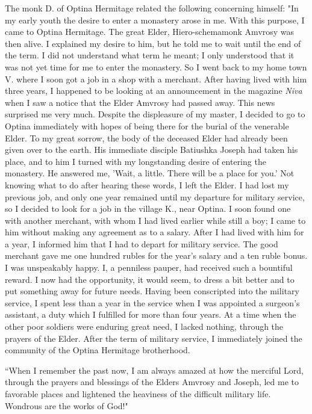 The monk D. of Optina Hermitage related the following concerning himself: "In my early youth the desire to enter a monastery arose in me. With this purpose, I came to Optina Hermitage. The great Elder, Hiero-schemamonk Amvrosy was then alive. I explained my desire to him, but he told me to wait until the end of the term. I did not understand what term he meant; I only understood that it was not yet time for me to enter the monastery. So I went back to my home town V. where I soon got a job in a shop with a merchant. After having lived with him three years, I happened to be looking at an announcement in the magazine \textit{Niva} when I saw a notice that the Elder Amvrosy had passed away. This news surprised me very much. Despite the displeasure of my master, I decided to go to Optina immediately with hopes of being there for the burial of the venerable Elder. To my great sorrow, the body of the deceased Elder had already been given over to the earth. His immediate disciple Batiushka Joseph had taken his place, and to him I turned with my longstanding desire of entering the monastery. He answered me, 'Wait, a little. There will be a place for you.' Not knowing what to do after hearing these words, I left the Elder. I had lost my previous job, and only one year remained until my departure for military service, so I decided to look for a job in the village K., near Optina. I soon found one with another merchant, with whom I had lived earlier while still a boy; I came to him without making any agreement as to a salary. After I had lived with him for a year, I informed him that I had to depart for military service. The good merchant gave me one hundred rubles for the year's salary and a ten ruble bonus. I was unspeakably happy. I, a penniless pauper, had received such a bountiful reward. I now had the opportunity, it would seem, to dress a bit better and to put something away for future needs. Having been conscripted into the military service, I spent less than a year in the service when I was appointed a surgeon's assistant, a duty which I fulfilled for more than four years. At a time when the other poor soldiers were enduring great need, I lacked nothing, through the prayers of the Elder. After the term of military service, I immediately joined the community of the Optina Hermitage brotherhood.

“When I remember the past now, I am always amazed at how the merciful Lord, through the prayers and blessings of the Elders Amvrosy and Joseph, led me to favorable places and lightened the heaviness of the difficult military life. Wondrous are the works of God!"

